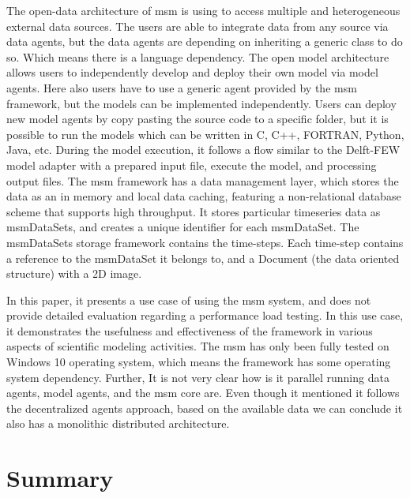 The open-data architecture of \acrshort{msm} is using to access multiple and heterogeneous external data sources. The users are able to integrate data from any source via data agents, but the data agents are depending on inheriting a generic class to do so. Which means there is a language dependency. The open model architecture allows users to independently develop and deploy their own model via model agents. Here also users have to use a generic agent provided by the \acrshort{msm} framework, but the models can be implemented independently. Users can deploy new model agents by copy pasting the source code to a specific folder, but it is possible to run the models which can be written in C, C++, FORTRAN, Python, Java, etc. During the model execution, it follows a flow similar to the Delft-FEW model adapter with a prepared input file, execute the model, and processing output files. The \acrshort{msm} framework has a data management layer, which stores the data as an in memory and local data caching, featuring a non-relational database scheme that supports high throughput. It stores particular timeseries data as msmDataSets, and creates a unique identifier for each msmDataSet. 
The msmDataSets storage framework contains the time-steps. Each time-step contains a reference to the msmDataSet it belongs to, and a Document (the data oriented structure) with a 2D image.

In this paper, it presents a use case of using the \acrshort{msm} system, and does not provide detailed evaluation regarding a performance load testing. In this use case, it demonstrates the usefulness and effectiveness of the framework in various aspects of scientific modeling activities. The msm has only been fully tested on Windows 10 operating system, which means the framework has some operating system dependency. Further, It is not very clear how is it parallel running data agents, model agents, and the \acrshort{msm} core are. Even though it mentioned it follows the decentralized agents approach, based on the available data we can conclude it also has a monolithic distributed architecture.

\section{Summary}
\label{se:lit_summary}

